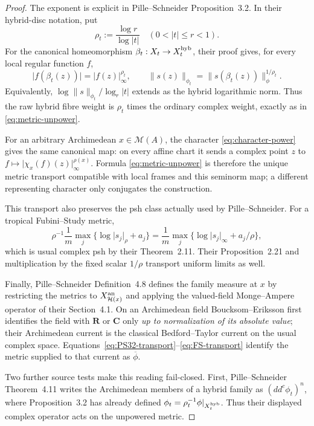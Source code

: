 \documentclass[11pt]{article}
\newcommand{\cM}{\mathcal M}
\newcommand{\R}{\mathbf R}
\newcommand{\C}{\mathbf C}
\newcommand{\norm}[1]{\lVert#1\rVert}
\newcommand{\abs}[1]{\lvert#1\rvert}
\begin{document}
\begin{proof}
The exponent is explicit in Pille--Schneider Proposition~3.2.  In their
hybrid-disc notation, put
\[
 \rho_t:=\frac{\log r}{\log\abs t}\quad(0<\abs t\leq r<1).
\]
For the canonical homeomorphism $\beta_t:X_t\to X_t^{\rm hyb}$, their
proof gives, for every local regular function $f$,
\begin{equation}
 \abs{f(\beta_t(z))}=\abs{f(z)}_\infty^{\rho_t},
 \qquad
 \norm{s(z)}_{\phi_t}
 =\norm{s(\beta_t(z))}_{\phi}^{1/\rho_t}.
\tag{1.5}\label{eq:PS32-transport}
\end{equation}
Equivalently,
$\log\norm{s}_{\phi_t}/\log_r\abs t$
extends as the hybrid logarithmic norm.  Thus the raw hybrid fibre weight is
$\rho_t$ times the ordinary complex weight, exactly as in
\eqref{eq:metric-unpower}.

For an arbitrary Archimedean $x\in\cM(A)$, the character
\eqref{eq:character-power} gives the same canonical map: on every affine
chart it sends a complex point $z$ to
$f\mapsto\abs{\chi_x(f)(z)}_\infty^{\rho(x)}$.  Formula
\eqref{eq:metric-unpower} is therefore the unique metric transport compatible
with local frames and this seminorm map; a different representing character
only conjugates the construction.

This transport also preserves the psh class actually used by
Pille--Schneider.  For a tropical Fubini--Study metric,
\[
 \rho^{-1}\frac1m\max_j
 \{\log\abs{s_j}_\rho+a_j\}
 =\frac1m\max_j
 \{\log\abs{s_j}_\infty+a_j/\rho\},
\tag{1.6}\label{eq:FS-transport}
\]
which is usual complex psh by their Theorem~2.11.  Their
Proposition~2.21 and multiplication by the fixed scalar $1/\rho$ transport
uniform limits as well.

Finally, Pille--Schneider Definition~4.8 defines the family measure at $x$
by restricting the metrics to $X_{\mathcal H(x)}^{\rm an}$ and applying the
valued-field Monge--Ampere operator of their Section~4.1.  On an
Archimedean field Boucksom--Eriksson first identifies the field with
$\R$ or $\C$ only \emph{up to normalization of its absolute value}; their
Archimedean current is the classical Bedford--Taylor current on the usual
complex space.  Equations~\eqref{eq:PS32-transport}--\eqref{eq:FS-transport}
identify the metric supplied to that current as $\overline\phi$.

Two further source tests make this reading fail-closed.  First,
Pille--Schneider Theorem~4.11 writes the Archimedean members of a hybrid
family as $(dd^c\phi_t)^n$, where Proposition~3.2 has already defined
$\phi_t=\rho_t^{-1}\phi|_{X_t^{\rm hyb}}$.  Thus their displayed complex
operator acts on the unpowered metric.


\end{proof}
\end{document}
